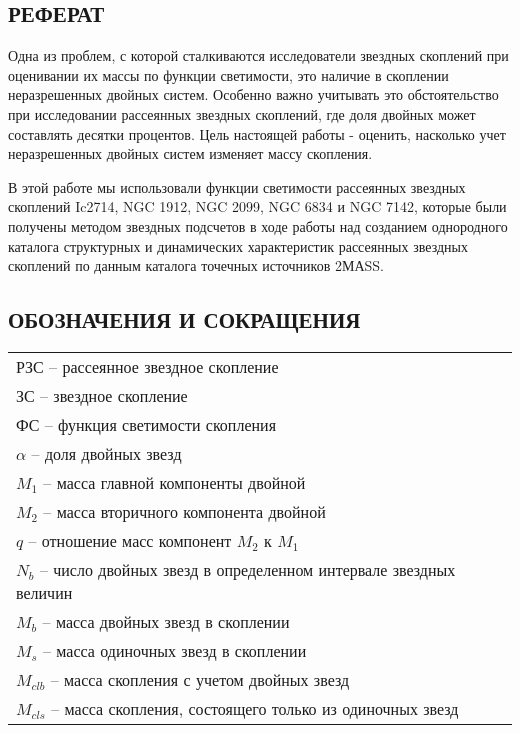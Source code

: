 \documentclass[a4paper,12pt]{article}
\begin{document}
\renewcommand{\contentsname}{ }

\setcounter{secnumdepth}{-1}

\begin{center}
\subsection{\bf{РЕФЕРАТ}}
\end{center}

 Одна из проблем, с которой сталкиваются исследователи звездных скоплений при оценивании их массы по функции светимости, это наличие в скоплении неразрешенных двойных систем. Особенно важно учитывать это обстоятельство при исследовании рассеянных звездных скоплений, где доля двойных может составлять десятки процентов. Цель настоящей работы - оценить, насколько учет неразрешенных двойных систем изменяет массу скопления.
 
В этой работе мы использовали функции светимости рассеянных звездных скоплений Ic2714, NGC 1912, NGC 2099, NGC 6834 и NGC 7142, которые были получены методом звездных подсчетов в ходе работы над созданием однородного каталога структурных и динамических характеристик рассеянных звездных скоплений по данным каталога точечных источников 2МАSS.
\newpage


\begin{center}
\section{\bf{ОБОЗНАЧЕНИЯ И СОКРАЩЕНИЯ}}
\end{center}

\begin{tabular}{l}
РЗС -- рассеянное звездное скопление\\
ЗС -- звездное скопление\\
ФС -- функция светимости скопления\\
$\alpha$ -- доля двойных звезд\\
$M_1$ -- масса главной компоненты двойной\\
$M_2$ -- масса вторичного компонента двойной\\
$q$ -- отношение масс компонент $M_2$ к $M_1$\\
$N_b$ -- число двойных звезд в определенном интервале звездных величин\\ 
$M_b$ -- масса двойных звезд в скоплении\\
$M_s$ -- масса одиночных звезд в скоплении\\
$M_{clb}$ -- масса скопления с учетом двойных звезд\\
$M_{cls}$ -- масса скопления, состоящего только из одиночных звезд\\
\end{tabular}
\end{document}

